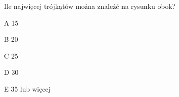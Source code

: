 \begin{tresc}
Ile najwięcej trójkątów można znaleźć na rysunku obok?
\end{tresc}
\begin{wariant}{A} 15 \end{wariant}
\begin{wariant}{B} 20 \end{wariant}
\begin{wariant}{C} 25 \end{wariant}
\begin{wariant}{D} 30 \end{wariant}
\begin{wariant}{E} 35 lub więcej \end{wariant}
